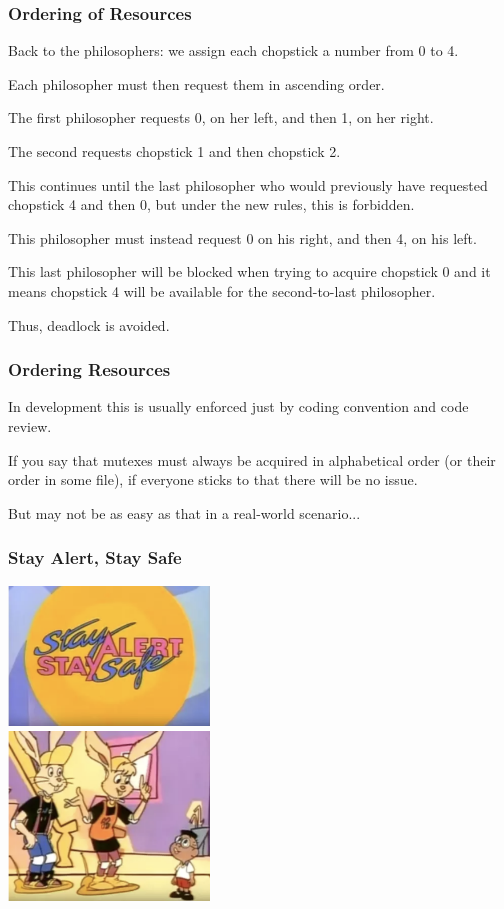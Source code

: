 \begin{frame}
	\frametitle{Ordering of Resources}

	Back to the philosophers: we assign each chopstick a number from 0 to 4.

	Each philosopher must then request them in ascending order.

	The first philosopher requests 0, on her left, and then 1, on her right.

	The second requests chopstick 1 and then chopstick 2.

	This continues until the last philosopher who would previously have requested chopstick 4 and then 0, but under the new rules, this is forbidden.

	This philosopher must instead request 0 on his right, and then 4, on his left.

	This last philosopher will be blocked when trying to acquire chopstick 0 and it means chopstick 4 will be available for the second-to-last philosopher.

	Thus, deadlock is avoided.

\end{frame}



\begin{frame}
	\frametitle{Ordering Resources}

	In development this is usually enforced just by coding convention and code review.

	If you say that mutexes must always be acquired in alphabetical order (or their order in some file), if everyone sticks to that there will be no issue.

	But may not be as easy as that in a real-world scenario...

\end{frame}


\begin{frame}
	\frametitle{Stay Alert, Stay Safe}

	\begin{center}
		\includegraphics[width=0.4\textwidth]{images/sass1.png}\\
		\includegraphics[width=0.4\textwidth]{images/sass2.png}
	\end{center}


\end{frame}


